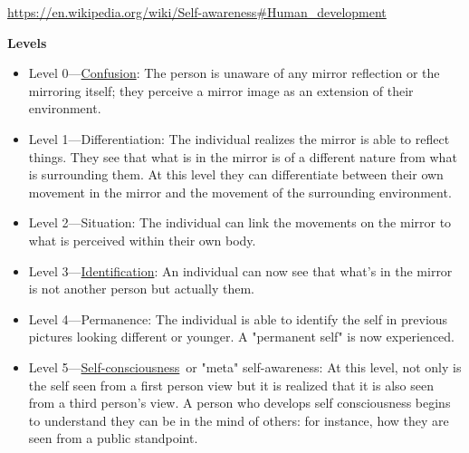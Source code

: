 \documentclass{book}
\providecommand{\ProjectDeepHeading}[2]{%
    \par\medskip\noindent\textbf{#2}\par\smallskip
}
\begin{document}
\url{https://en.wikipedia.org/wiki/Self-awareness\#Human_development}
    \ProjectDeepHeading{8}{Levels}
        \begin{itemize}
            \item Level 0—\href{https://en.wikipedia.org/wiki/Confusion}{Confusion}: The person is unaware of any mirror reflection or the mirroring itself; they perceive a mirror image as an extension of their environment.
        \end{itemize}
        \begin{itemize}
            \item Level 1—Differentiation: The individual realizes the mirror is able to reflect things. They see that what is in the mirror is of a different nature from what is surrounding them. At this level they can differentiate between their own movement in the mirror and the movement of the surrounding environment.
        \end{itemize}
        \begin{itemize}
            \item Level 2—Situation: The individual can link the movements on the mirror to what is perceived within their own body.
        \end{itemize}
        \begin{itemize}
            \item Level 3—\href{https://en.wikipedia.org/wiki/Identification_(psychology)}{Identification}: An individual can now see that what's in the mirror is not another person but actually them.
        \end{itemize}
        \begin{itemize}
            \item Level 4—Permanence: The individual is able to identify the self in previous pictures looking different or younger. A "permanent self" is now experienced.
        \end{itemize}
        \begin{itemize}
            \item Level 5—\href{https://en.wikipedia.org/wiki/Self-consciousness}{Self-consciousness} or "meta" self-awareness: At this level, not only is the self seen from a first person view but it is realized that it is also seen from a third person's view. A person who develops self consciousness begins to understand they can be in the mind of others: for instance, how they are seen from a public standpoint.
        \end{itemize}
\end{document}
